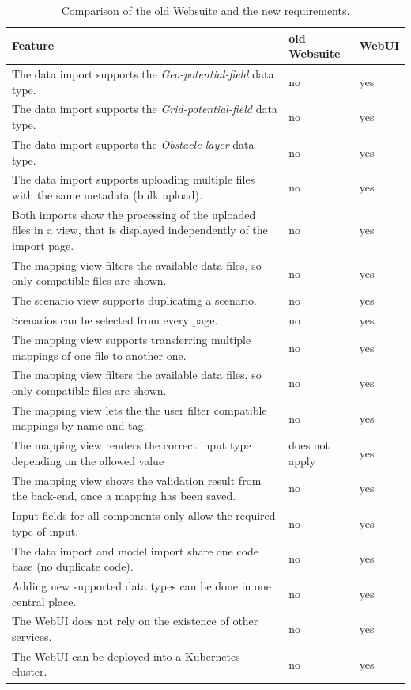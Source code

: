 \begin{table}[H]
	\caption{Comparison of the old Websuite and the new requirements.}
	\begin{tabularx}{\textwidth}{|X|l|l|}
	\hline
	\textbf{Feature} & \textbf{old Websuite} & \textbf{WebUI} \\ \hline
	The data import supports the \textit{Geo-potential-field} data type. & no & yes \\ \hline
	The data import supports the \textit{Grid-potential-field} data type. & no & yes \\ \hline
	The data import supports the \textit{Obstacle-layer} data type. & no & yes \\ \hline
	The data import supports uploading multiple files with the same metadata (bulk upload). & no & yes \\ \hline
	Both imports show the processing of the uploaded files in a view, that is displayed independently of the import page. & no & yes \\ \hline
	The mapping view filters the available data files, so only compatible files are shown. & no & yes \\ \hline
	The scenario view supports duplicating a scenario. & no & yes \\ \hline
	Scenarios can be selected from every page. & no & yes \\ \hline
	The mapping view supports transferring multiple mappings of one file to another one. & no & yes \\ \hline
	The mapping view filters the available data files, so only compatible files are shown. & no & yes \\ \hline
	The mapping view lets the the user filter compatible mappings by name and tag. & no & yes \\ \hline
	The mapping view renders the correct input type depending on the allowed value & does not apply & yes \\ \hline
	The mapping view shows the validation result from the back-end, once a mapping has been saved. & no & yes \\ \hline
	Input fields for all components only allow the required type of input. & no & yes \\ \hline
	The data import and model import share one code base (no duplicate code). & no & yes \\ \hline
	Adding new supported data types can be done in one central place. & no & yes \\ \hline
	The WebUI does not rely on the existence of other services. & no & yes \\ \hline
	The WebUI can be deployed into a Kubernetes cluster. & no & yes \\ \hline
	\end{tabularx}
\end{table}
